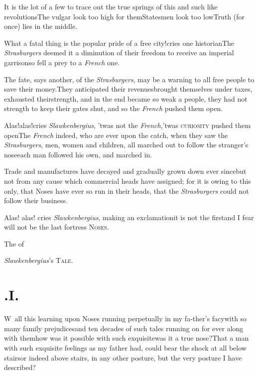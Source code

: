 \documentclass{article}
\begin{document}
It is the lot of a few to trace out the true springs of this and
such like revolutions\tsk The vulgar look too high for
them\tsk Statesmen look too low\tsk Truth (for once)
lies in the middle.

\newpage
What a fatal thing is the popular pride of a free city!\@ cries
one historian\tsk The \textit{Strasburgers} deemed it a diminution
of their freedom to receive an imperial garrison\tsk so
fell a prey to a \textit{French} one.

The fate, says another, of the \textit{Strasburgers}, may be a
warning to all free people to save their money.\tsk They
anticipated their revenues\tsk brought themselves under
taxes, exhausted their\break strength, and in the end became so weak a
people, they had not strength to keep their gates shut, and so the
\textit{French} pushed them open.

Alas!\@ alas!\@ cries \textit{Slawkenbergius}, ’twas not the
\textit{French},\tsk ’twas \textsc{curiosity}
pushed them open\tsk The \textit{French} indeed, who are
ever upon the catch, when they saw the \textit{Strasburgers}, men,
women and children, all marched out to follow the stranger’s
nose\tsh each man followed his own, and marched in.

Trade and manufactures have decayed and gradually grown down
ever since\tsk but not from any cause which commercial heads have
assigned; for it is owing to this only, that Noses have ever so run
in their heads, that the \textit{Strasburgers} could not follow their
business.

Alas! alas! cries \textit{Slawkenbergius}, making an
exclamation\tsk it is not the first\tsh and I fear will not be the last
fortress
\break
\textsc{Noses}.

\bigskip
\centerline{The  of}
\centerline{\textit{Slawkenbergius}’s \textsc{Tale}.}

\bigskip

\newpage
\section{.\enspace I.}

\lettrine{W}{\,} all this learning upon Noses
running perpetually in my fa-\break ther’s facy\tsk with so
many family prejudices\tsk and ten decades of such tales
running on for ever along with them\tsk how was it possible
with such exquisite\tsk was it a true nose?\tsk That a man
with such exquisite feelings as my father had, could bear
the shock at all below stairs\tsk or indeed above stairs, in
any other posture, but the very posture I have described?
\end{document}
